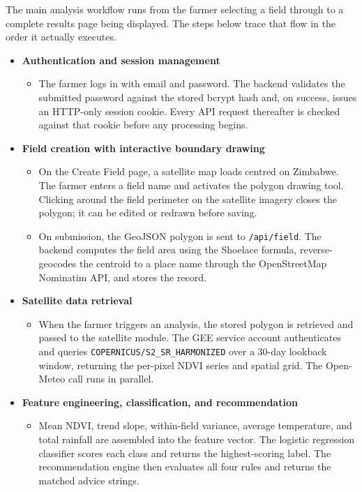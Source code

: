The main analysis workflow runs from the farmer selecting a field through to a complete results page being displayed. The steps below trace that flow in the order it actually executes.

\begin{itemize}
  \item \textbf{Authentication and session management}
    \begin{itemize}
      \item[-] The farmer logs in with email and password. The backend validates the submitted password against the stored bcrypt hash and, on success, issues an HTTP-only session cookie. Every API request thereafter is checked against that cookie before any processing begins.
    \end{itemize}

  \item \textbf{Field creation with interactive boundary drawing}
    \begin{itemize}
      \item[-] On the Create Field page, a satellite map loads centred on Zimbabwe. The farmer enters a field name and activates the polygon drawing tool. Clicking around the field perimeter on the satellite imagery closes the polygon; it can be edited or redrawn before saving.
      \item[-] On submission, the GeoJSON polygon is sent to \texttt{/api/field}. The backend computes the field area using the Shoelace formula, reverse-geocodes the centroid to a place name through the OpenStreetMap Nominatim API, and stores the record.
    \end{itemize}

  \item \textbf{Satellite data retrieval}
    \begin{itemize}
      \item[-] When the farmer triggers an analysis, the stored polygon is retrieved and passed to the satellite module. The GEE service account authenticates and queries \texttt{COPERNICUS/S2\_SR\_HARMONIZED} over a 30-day lookback window, returning the per-pixel NDVI series and spatial grid. The Open-Meteo call runs in parallel.
    \end{itemize}

  \item \textbf{Feature engineering, classification, and recommendation}
    \begin{itemize}
      \item[-] Mean NDVI, trend slope, within-field variance, average temperature, and total rainfall are assembled into the feature vector. The logistic regression classifier scores each class and returns the highest-scoring label. The recommendation engine then evaluates all four rules and returns the matched advice strings.
    \end{itemize}


\end{itemize}
